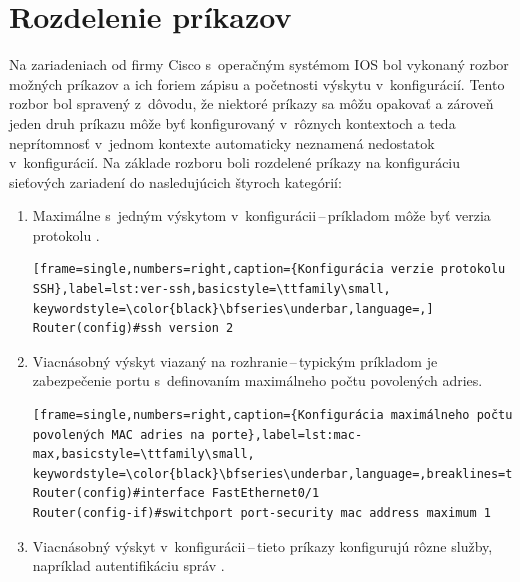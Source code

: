\newpage
\section{Rozdelenie príkazov}
Na zariadeniach od firmy Cisco s~operačným systémom IOS bol vykonaný rozbor možných príkazov a ich foriem zápisu a početnosti výskytu v~konfigurácií. Tento rozbor bol spravený z~dôvodu, že niektoré príkazy sa môžu opakovať a zároveň jeden druh príkazu môže byť konfigurovaný v~rôznych kontextoch a teda neprítomnosť v~jednom kontexte automaticky neznamená nedostatok v~konfigurácií. Na základe rozboru boli rozdelené príkazy na konfiguráciu sieťových zariadení do nasledujúcich štyroch kategórií:
\\
\begin{enumerate}
	\item Maximálne s~jedným výskytom v~konfigurácii\,--\,príkladom môže byť verzia protokolu .
	
\begin{minipage}{\linewidth}		
\begin{lstlisting}[frame=single,numbers=right,caption={Konfigurácia verzie protokolu SSH},label=lst:ver-ssh,basicstyle=\ttfamily\small, keywordstyle=\color{black}\bfseries\underbar,language=,]
Router(config)#ssh version 2
\end{lstlisting}
\end{minipage}
	
	\item \vspace{2em} Viacnásobný výskyt viazaný na rozhranie\,--\,typickým príkladom je zabezpečenie portu s~definovaním maximálneho počtu povolených  adries.
	
\begin{minipage}{\linewidth}		
\begin{lstlisting}[frame=single,numbers=right,caption={Konfigurácia maximálneho počtu povolených MAC adries na porte},label=lst:mac-max,basicstyle=\ttfamily\small, keywordstyle=\color{black}\bfseries\underbar,language=,breaklines=true]
Router(config)#interface FastEthernet0/1
Router(config-if)#switchport port-security mac address maximum 1
\end{lstlisting}
\end{minipage}

	\item \vspace{2em} Viacnásobný výskyt v~konfigurácii\,--\,tieto príkazy konfigurujú rôzne služby, napríklad autentifikáciu správ .


\end{enumerate}
